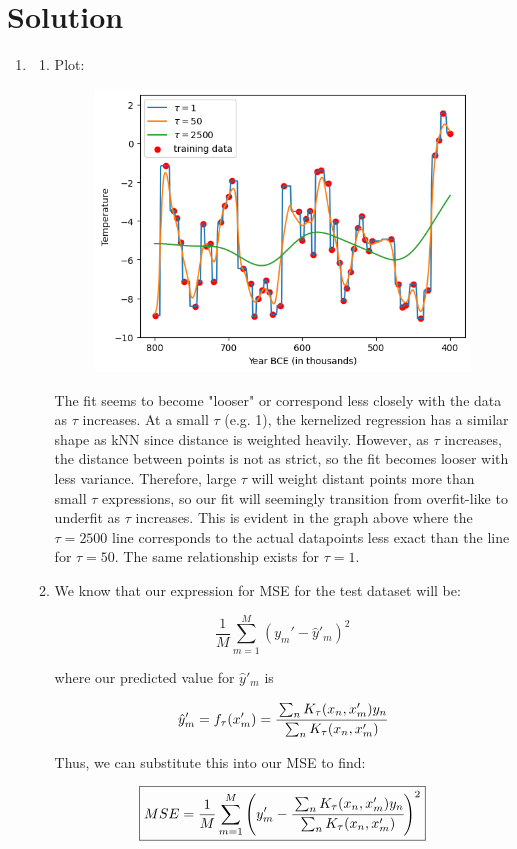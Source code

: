 \documentclass[submit]{../harvardml}
\newenvironment{solution}
  {\color{blue}\section*{Solution}}
{}
\begin{document}
\begin{solution}
\begin{enumerate}
\begin{enumerate}
	       \end{enumerate}
        \item 
        \begin{enumerate}
            \item Plot:
            \begin{figure}[H]
                \centering
                \includegraphics[width=0.5\linewidth]{1.2.1.png}
            \end{figure}

            The fit seems to become "looser" or correspond less closely with the data as $\tau$ increases. At a small $\tau$ (e.g. 1), the kernelized regression has a similar shape as kNN  since distance is weighted heavily. However, as $\tau$ increases, the distance between points is not as strict, so the fit becomes looser with less variance. Therefore, large $\tau$ will weight distant points more than small $\tau$ expressions, so our fit will seemingly transition from overfit-like to underfit as $\tau$ increases. This is evident in the graph above where the $\tau=2500$ line corresponds to the actual datapoints less exact than the line for $\tau=50$. The same relationship exists for $\tau=1$.
            
            \item We know that our expression for MSE for the test dataset will be:

            \[
            \frac{1}{M}\sum_{m=1}^M (y_m' - \hat{y}'_m)^2
            \]

            where our predicted value for $\hat{y}'_m$ is

            \[
            \hat{y}'_m = f_\tau(x'_m) = \cfrac{\sum_{n} K_\tau(x_n,x'_m) y_n}{\sum_n K_\tau(x_n, x'_m)}
            \]

            Thus, we can substitute this into our MSE to find:

            \[
            \boxed{MSE = \frac{1}{M} \sum_{m=1}^{M} \left(y'_m - \cfrac{\sum_{n} K_\tau(x_n,x'_m) y_n}{\sum_n K_\tau(x_n, x'_m)}\right)^2}
            \]


\end{enumerate}
\end{enumerate}
\end{solution}
\end{document}
